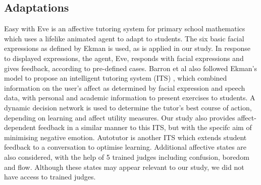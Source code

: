 \documentclass[12pt,a4paper]{article}
\begin{document}
\subsection{Adaptations}
Easy with Eve is an affective tutoring system for primary school mathematics which uses a lifelike animated agent to adapt to students. The six basic facial expressions as defined by Ekman \cite{ekman1992argument} is used, as is applied in our study. In response to displayed expressions, the agent, Eve, responds with facial expressions and gives feedback, according to pre-defined cases. Barron et al also followed Ekman's model to propose an intelligent tutoring system (ITS) \cite{barron2012intelligent}, which combined information on the user's affect as determined by facial expression and speech data, with personal and academic information to present exercises to students. A dynamic decision network is used to determine the tutor's best course of action, depending on learning and affect utility measures. Our study also provides affect-dependent feedback in a similar manner to this ITS, but with the specifc aim of minimising negative emotion. Autotutor is another ITS which extends student feedback to a conversation to optimise learning. Additional affective states are also considered, with the help of 5 trained judges including confusion, boredom and flow. Although these states may appear relevant to our study, we did not have access to trained judges.
\end{document}
